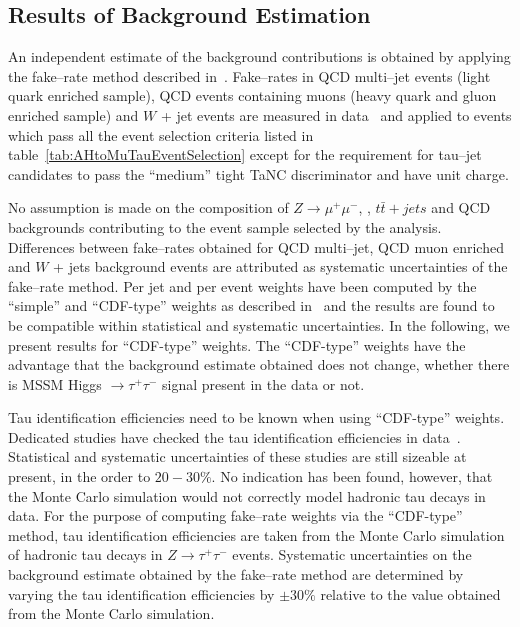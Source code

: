 \subsection{Results of Background Estimation}
%
An independent estimate of the background contributions is obtained by applying
the fake--rate method described in~\cite{CMS_AN_2010-074}.  Fake--rates in QCD
multi--jet events (light quark enriched sample), QCD events containing muons
(heavy quark and gluon enriched sample) and $W$ + jet events are measured in
data~\cite{PFT-10-004,CMS_AN_2010-XXX} and applied to events which pass all the
event selection criteria listed in table~\ref{tab:AHtoMuTauEventSelection}
except for the requirement for tau--jet candidates to pass the ``medium'' tight
TaNC discriminator and have unit charge.

No assumption is made on the composition of $Z \to \mu^{+} \mu^{-}$, \WpJets,
$t\bar{t} + jets$ and QCD backgrounds contributing to the event sample selected
by the analysis.  Differences between fake--rates obtained for QCD multi--jet,
QCD muon enriched and $W$ + jets background events are attributed as systematic
uncertainties of the fake--rate method.  Per jet and per event weights have been
computed by the ``simple'' and ``CDF-type'' weights as described
in~\cite{CMS_AN_2010-074} and the results are found to be compatible within
statistical and systematic uncertainties.  In the following, we present results
for ``CDF-type'' weights.  The ``CDF-type'' weights have the advantage that the
background estimate obtained does not change, whether there is MSSM Higgs $\to
\tau^{+} \tau^{-}$ signal present in the data or not.

Tau identification efficiencies need to be known when using ``CDF-type''
weights.  Dedicated studies have checked the tau identification efficiencies in
data~\cite{tauIdEff01,tauIdEff02}.  Statistical and systematic uncertainties of
these studies are still sizeable at present, in the order to $20-30\%$.  No
indication has been found, however, that the Monte Carlo simulation would not
correctly model hadronic tau decays in data.  For the purpose of computing
fake--rate weights via the ``CDF-type'' method, tau identification efficiencies
are taken from the Monte Carlo simulation of hadronic tau decays in $Z \to
\tau^{+} \tau^{-}$ events.  Systematic uncertainties on the background estimate
obtained by the fake--rate method are determined by varying the tau
identification efficiencies by $\pm 30\%$ relative to the value obtained from
the Monte Carlo simulation.

